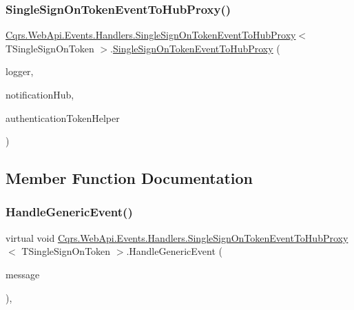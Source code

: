 \subsubsection{\texorpdfstring{Single\+Sign\+On\+Token\+Event\+To\+Hub\+Proxy()}{SingleSignOnTokenEventToHubProxy()}}
{\footnotesize\ttfamily \hyperlink{classCqrs_1_1WebApi_1_1Events_1_1Handlers_1_1SingleSignOnTokenEventToHubProxy}{Cqrs.\+Web\+Api.\+Events.\+Handlers.\+Single\+Sign\+On\+Token\+Event\+To\+Hub\+Proxy}$<$ T\+Single\+Sign\+On\+Token $>$.\hyperlink{classCqrs_1_1WebApi_1_1Events_1_1Handlers_1_1SingleSignOnTokenEventToHubProxy}{Single\+Sign\+On\+Token\+Event\+To\+Hub\+Proxy} (\begin{DoxyParamCaption}\item[{I\+Logger}]{logger,  }\item[{\hyperlink{interfaceCqrs_1_1WebApi_1_1SignalR_1_1Hubs_1_1INotificationHub}{I\+Notification\+Hub}}]{notification\+Hub,  }\item[{\hyperlink{interfaceCqrs_1_1Authentication_1_1IAuthenticationTokenHelper}{I\+Authentication\+Token\+Helper}$<$ T\+Single\+Sign\+On\+Token $>$}]{authentication\+Token\+Helper }\end{DoxyParamCaption})\hspace{0.3cm}{\ttfamily [protected]}}



\subsection{Member Function Documentation}
\mbox{\label{classCqrs_1_1WebApi_1_1Events_1_1Handlers_1_1SingleSignOnTokenEventToHubProxy_ad8ecdd318f7dc37de14760879fd52668_ad8ecdd318f7dc37de14760879fd52668}} 
\subsubsection{\texorpdfstring{Handle\+Generic\+Event()}{HandleGenericEvent()}}
{\footnotesize\ttfamily virtual void \hyperlink{classCqrs_1_1WebApi_1_1Events_1_1Handlers_1_1SingleSignOnTokenEventToHubProxy}{Cqrs.\+Web\+Api.\+Events.\+Handlers.\+Single\+Sign\+On\+Token\+Event\+To\+Hub\+Proxy}$<$ T\+Single\+Sign\+On\+Token $>$.Handle\+Generic\+Event (\begin{DoxyParamCaption}\item[{\hyperlink{interfaceCqrs_1_1Events_1_1IEvent}{I\+Event}$<$ T\+Single\+Sign\+On\+Token $>$}]{message }\end{DoxyParamCaption})\hspace{0.3cm}{\ttfamily [protected]}, {\ttfamily [virtual]}}



